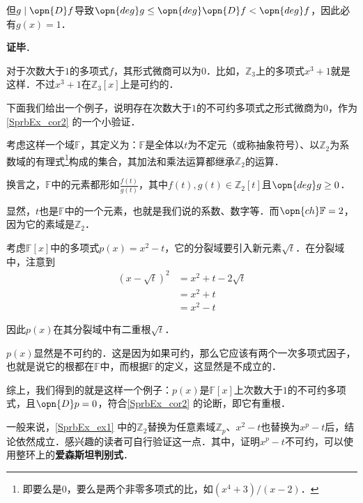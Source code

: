 但$g\mid \opn{D}f$导致$\opn{deg}g\leq\opn{deg}\opn{D}f<\opn{deg}f$，因此必有$g(x)=1$．



\textbf{证毕}．

对于次数大于$1$的多项式$f$，其形式微商可以为$0$．比如，$\mathbb{Z}_3$上的多项式$x^3+1$就是这样．不过$x^3+1$在$\mathbb{Z}_3[x]$上是可约的．

下面我们给出一个例子，说明存在次数大于$1$的不可约多项式之形式微商为$0$，作为\autoref{SprbEx_cor2} 的一个小验证．





\begin{example}{}\label{SprbEx_ex1}

考虑这样一个域$\mathbb{F}$，其定义为：$\mathbb{F}$是全体以$t$为不定元（或称抽象符号）、以$\mathbb{Z}_2$为系数域的有理式\footnote{即要么是$0$，要么是两个非零多项式的比，如$(x^4+3)/(x-2)$．}构成的集合，其加法和乘法运算都继承$\mathbb{Z}_2$的运算．

换言之，$\mathbb{F}$中的元素都形如$\frac{f(t)}{g(t)}$，其中$f(t), g(t)\in\mathbb{Z}_2[t]$且$\opn{deg}g\geq 0$．

显然，$t$也是$\mathbb{F}$中的一个元素，也就是我们说的系数、数字等．而$\opn{ch}\mathbb{F}=2$，因为它的素域是$\mathbb{Z}_2$．

考虑$\mathbb{F}[x]$中的多项式$p(x) = x^2-t$，它的分裂域要引入新元素$\sqrt{t}$．在分裂域中，注意到
\begin{equation}
\begin{aligned}
(x-\sqrt{t})^2&=x^2+t-2\sqrt{t}\\
&=x^2+t\\
&=x^2-t
\end{aligned}
\end{equation}

因此$p(x)$在其分裂域中有二重根$\sqrt{t}$．

$p(x)$显然是不可约的．这是因为如果可约，那么它应该有两个一次多项式因子，也就是说它的根都在$\mathbb{F}$中，而根据$\mathbb{F}$的定义，这显然是不成立的．

综上，我们得到的就是这样一个例子：$p(x)$是$\mathbb{F}[x]$上次数大于$1$的不可约多项式，且$\opn{D}p=0$，符合\autoref{SprbEx_cor2} 的论断，即它有重根．

\end{example}

一般来说，\autoref{SprbEx_ex1} 中的$\mathbb{Z}_2$替换为任意素域$\mathbb{Z}_p$、$x^2-t$也替换为$x^p-t$后，结论依然成立．感兴趣的读者可自行验证这一点．其中，证明$x^p-t$不可约，可以使用整环上的\textbf{爱森斯坦判别式}．

